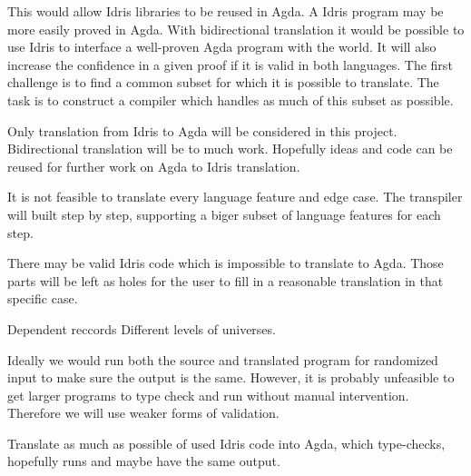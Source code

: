 \documentclass{scrartcl}
\begin{document}
This would allow Idris libraries to be reused in Agda. A Idris program may be
more easily proved in Agda. With bidirectional translation it would be possible
to use Idris to interface a well-proven Agda program with the world.  It will
also increase the confidence in a given proof if it is valid in both languages.
The first challenge is to find a common subset for which it is possible to
translate. The task is to construct a compiler which handles as much of this
subset as possible.


Only translation from Idris to Agda will be considered in this project.
Bidirectional translation will be to much work. Hopefully ideas and code can be
reused for further work on Agda to Idris translation.

It is not feasible to translate every language feature and edge case.
The transpiler will built step by step, supporting a biger subset of language
features for each step.

There may be valid Idris code which is impossible to translate to Agda. Those
parts will be left as holes for the user to fill in a reasonable translation in
that specific case.

Dependent reccords 
Different levels of universes.

Ideally we would run both the source and translated program for randomized
input to make sure the output is the same. However, it is probably unfeasible
to get larger programs to type check and run without manual intervention.
Therefore we will use weaker forms of validation.


Translate as much as possible of used Idris code into Agda, which type-checks,
hopefully runs and maybe have the same output.

\end{document}

